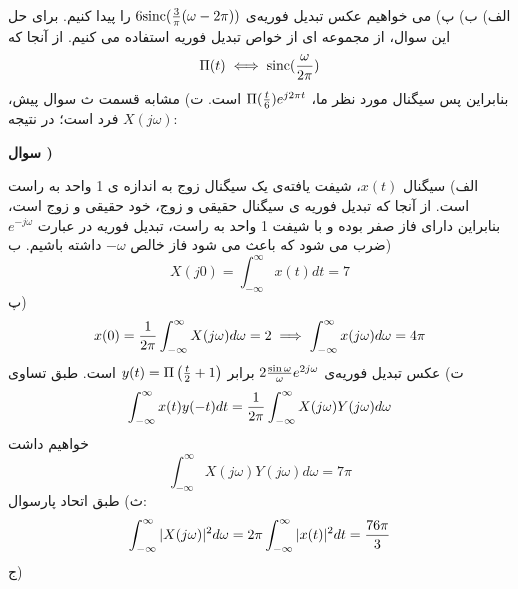 \documentclass[10pt,letterpaper]{article}
\newcommand{\nl}{\newline\newline}
\newcounter{QuestionNumber}
\newcommand{\Q}{
\textbf{
سوال \theQuestionNumber)
}
\stepcounter{QuestionNumber}
}
\begin{document}
الف)
ب) 
پ) می خواهیم عکس تبدیل فوریه‌ی 
$
6\text{sinc}({3\over \pi}(\omega-2\pi))
$
 را پیدا کنیم. برای حل این سوال، از مجموعه ای از خواص تبدیل فوریه استفاده می کنیم. از آنجا که
$$
\Pi(t)\iff \text{sinc}({\omega\over 2\pi})
$$
بنابراین
پس سیگنال مورد نظر ما، 
$
\Pi({t\over 6})e^{j2\pi t}
$
 است.
\nl
ت) مشابه قسمت ث سوال پیش، $X(j\omega)$ فرد است؛ در نتیجه:


\Q

الف) سیگنال $x(t)$، شیفت یافته‌ی یک سیگنال زوج به اندازه ی 1 واحد به راست است. از آنجا که تبدیل فوریه ی سیگنال حقیقی و زوج، خود حقیقی و زوج است، بنابراین دارای فاز صفر بوده و با شیفت 1 واحد به راست، تبدیل فوریه در عبارت 
$
e^{-j\omega}
$
 ضرب می شود که باعث می شود فاز خالص 
$
-\omega
$
 داشته باشیم.
\nl
ب)
$$
X(j0)=\int_{-\infty}^\infty x(t)dt=7
$$
پ)
$$
x(0)={1\over 2\pi} \int_{-\infty}^\infty X(j\omega)d\omega=2\implies
\int_{-\infty}^\infty x(j\omega)d\omega=4\pi
$$
\nl
ت) عکس تبدیل فوریه‌ی 
$
2{\sin\omega\over \omega}e^{2j\omega}
$
 برابر 
$
y(t)=\Pi\left({t\over 2}+1\right)
$
 است. طبق تساوی
$$
\int_{-\infty}^{\infty} x(t)y(-t)dt={1\over 2\pi}\int_{-\infty}^{\infty} X(j\omega)Y(j\omega)d\omega
$$
خواهیم داشت
$$
\int_{-\infty}^{\infty} X(j\omega)Y(j\omega)d\omega=7\pi
$$
ث) طبق اتحاد پارسوال:
$$
\int_{-\infty}^\infty |X(j\omega)|^2d\omega=
2\pi\int_{-\infty}^\infty |x(t)|^2dt={76\pi\over 3}
$$
\nl
ج)
\end{document}
